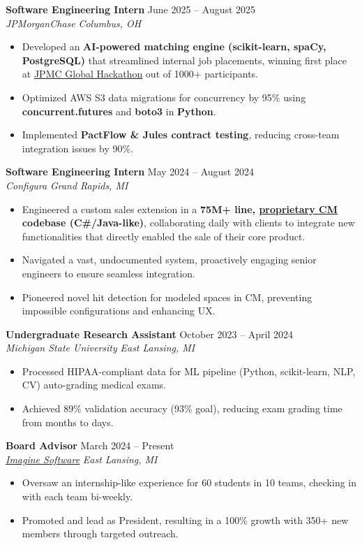 \documentclass[letterpaper,11pt]{article}
\newcommand{\resumeItem}[1]{
  \item\small{
    {#1 \vspace{-2pt}}
  }
}
\newcommand{\resumeSubheading}[4]{
  \vspace{-2pt}\item
  \textbf{#1} \hfill #2 \\
  \textit{\small#3} \hfill \textit{\small #4} \\
  \vspace{-7pt} %
}
\newcommand{\resumeItemListStart}{\begin{itemize}}
\newcommand{\resumeItemListEnd}{\end{itemize}\vspace{-5pt}}
\begin{document}
    \resumeSubheading
      {Software Engineering Intern}{June 2025 -- August 2025}
      {JPMorganChase}{Columbus, OH}
    \resumeItemListStart
        \resumeItem{Developed an \textbf{AI-powered matching engine (scikit-learn, spaCy, PostgreSQL)} that streamlined internal job placements, winning first place at \underline{\href{https://www.linkedin.com/posts/indi-de-silva_at-jpmorganchase-our-internship-program-activity-7355579081490354177-NYLE}{JPMC Global Hackathon}} out of 1000+ participants.}
        \resumeItem{Optimized AWS S3 data migrations for concurrency by 95\% using \textbf{concurrent.futures} and \textbf{boto3} in \textbf{Python}.}
        \resumeItem{Implemented \textbf{PactFlow \& Jules contract testing}, reducing cross-team integration issues by 90\%.}
    \resumeItemListEnd

    \resumeSubheading
      {Software Engineering Intern}{May 2024 -- August 2024}
      {Configura}{Grand Rapids, MI}
      \resumeItemListStart
        \resumeItem{Engineered a custom sales extension in a \textbf{75M+ line, \href{https://support.configura.com/hc/en-us/articles/360048763074-Configura-Magic-Introduction-and-Code-Philosophy}{proprietary CM} codebase (C\#/Java-like)}, collaborating daily with clients to integrate new functionalities that directly enabled the sale of their core product.}
        \resumeItem{Navigated a vast, undocumented system, proactively engaging senior engineers to ensure seamless integration.}
        \resumeItem{Pioneered novel hit detection for modeled spaces in CM, preventing impossible configurations and enhancing UX.}
      \resumeItemListEnd

\resumeSubheading
      {Undergraduate Research Assistant}{October 2023 -- April 2024}
      {Michigan State University}{East Lansing, MI}
      \resumeItemListStart
        \resumeItem{Processed HIPAA-compliant data for ML pipeline (Python, scikit-learn, NLP, CV) auto-grading medical exams.}
        \resumeItem{Achieved 89\% validation accuracy (93\% goal), reducing exam grading time from months to days.}
      \resumeItemListEnd

      \resumeSubheading
      {Board Advisor}{March 2024 -- Present}
      {\underline{\href{https://www.imagine-software.org/}{Imagine Software}}}{East Lansing, MI}
      \resumeItemListStart
        \resumeItem{Oversaw an internship-like experience for 60 students in 10 teams, checking in with each team bi-weekly.}
        \resumeItem{Promoted and lead as President, resulting in a 100\% growth with 350+ new members through targeted outreach.}
      \resumeItemListEnd
\end{document}
